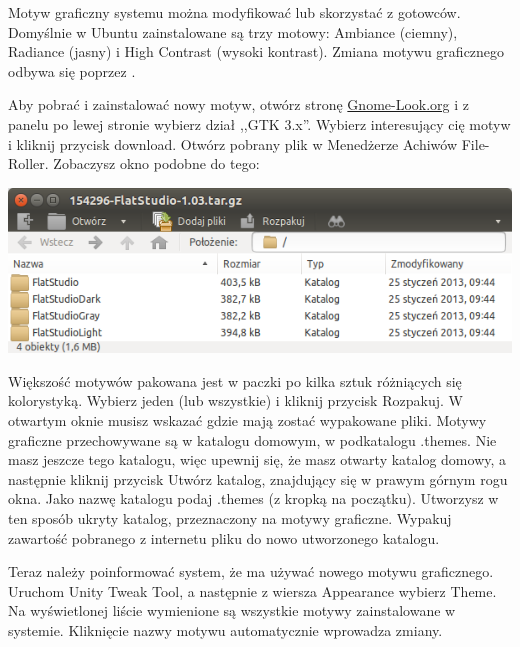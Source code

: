 Motyw graficzny systemu można modyfikować lub skorzystać z gotowców. Domyślnie w Ubuntu zainstalowane są trzy motowy: Ambiance (ciemny), Radiance (jasny) i High Contrast (wysoki kontrast). Zmiana motywu graficznego odbywa się poprzez .

Aby pobrać i zainstalować nowy motyw, otwórz stronę \href{http://gnome-look.org/}{Gnome-Look.org} i z panelu po lewej stronie wybierz dział ,,GTK 3.x''. Wybierz interesujący cię motyw i kliknij przycisk \textcolor{ubuntu_orange}{download}. Otwórz pobrany plik w Menedżerze Achiwów File-Roller. Zobaczysz okno podobne do tego:

\begin{center}
\includegraphics[width=\linewidth]{images/programy_fileRoller.png}
\end{center}

Większość motywów pakowana jest w paczki po kilka sztuk różniących się kolorystyką. Wybierz jeden (lub wszystkie) i kliknij przycisk \textcolor{ubuntu_orange}{Rozpakuj}. W otwartym oknie musisz wskazać gdzie mają zostać wypakowane pliki. Motywy graficzne przechowywane są w katalogu domowym, w podkatalogu .themes. Nie masz jeszcze tego katalogu, więc upewnij się, że masz otwarty katalog domowy, a następnie kliknij przycisk \textcolor{ubuntu_orange}{Utwórz katalog}, znajdujący się w prawym górnym rogu okna. Jako nazwę katalogu podaj .themes (z kropką na początku). Utworzysz w ten sposób ukryty katalog, przeznaczony na motywy graficzne. Wypakuj zawartość pobranego z internetu pliku do nowo utworzonego katalogu.

Teraz należy poinformować system, że ma używać nowego motywu graficznego. Uruchom \textcolor{ubuntu_orange}{Unity Tweak Tool}, a następnie z wiersza \textcolor{ubuntu_orange}{Appearance} wybierz \textcolor{ubuntu_orange}{Theme}. Na wyświetlonej liście wymienione są wszystkie motywy zainstalowane w systemie. Kliknięcie nazwy motywu automatycznie wprowadza zmiany.
